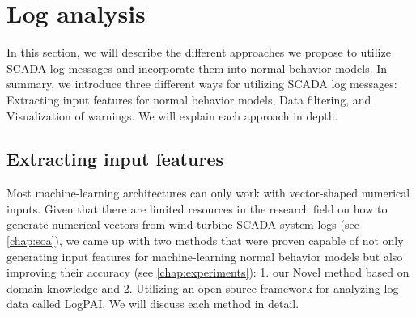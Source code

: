 \section{Log analysis}
In this section, we will describe the different approaches we propose to utilize SCADA log messages and incorporate them into normal behavior models.
In summary, we introduce three different ways for utilizing SCADA log messages: Extracting input features for normal behavior models, Data filtering, and Visualization of warnings.
We will explain each approach in depth.

\subsection{Extracting input features}
  Most machine-learning architectures can only work with vector-shaped numerical inputs. Given that there are limited resources in the research field on how to generate 
  numerical vectors from wind turbine SCADA system logs (see \ref{chap:soa}), we came up with two methods that were proven capable of not only generating input features for 
  machine-learning normal behavior models but also improving their accuracy (see \ref{chap:experiments}): 1. our Novel method based on domain knowledge and 
  2. Utilizing an open-source framework for analyzing log data called LogPAI. We will discuss each method in detail.

